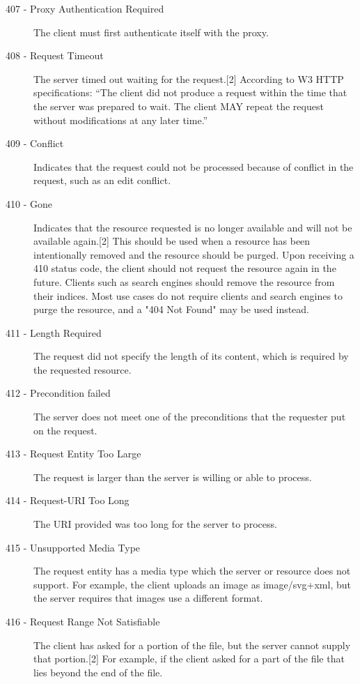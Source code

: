 \begin{description}
	\item [407 - Proxy Authentication Required] The client must first authenticate itself with the proxy.

	\item [408 - Request Timeout] The server timed out waiting for the request.[2] According to W3 HTTP specifications: \enquote{The client did not produce a request within the time that the server was prepared to wait. The client MAY repeat the request without modifications at any later time.}

	\item [409 - Conflict] Indicates that the request could not be processed because of conflict in the request, such as an edit conflict.

	\item [410 - Gone] Indicates that the resource requested is no longer available and will not be available again.[2] This should be used when a resource has been intentionally removed and the resource should be purged. Upon receiving a 410 status code, the client should not request the resource again in the future. Clients such as search engines should remove the resource from their indices. Most use cases do not require clients and search engines to purge the resource, and a "404 Not Found" may be used instead.

	\item [411 - Length Required] The request did not specify the length of its content, which is required by the requested resource.

	\item [412 - Precondition failed] The server does not meet one of the preconditions that the requester put on the request.

	\item [413 - Request Entity Too Large] The request is larger than the server is willing or able to process.

	\item [414 - Request-URI Too Long] The URI provided was too long for the server to process.

	\item [415 - Unsupported Media Type] The request entity has a media type which the server or resource does not support. For example, the client uploads an image as image/svg+xml, but the server requires that images use a different format.

	\item [416 - Request Range Not Satisfiable] The client has asked for a portion of the file, but the server cannot supply that portion.[2] For example, if the client asked for a part of the file that lies beyond the end of the file.


\end{description}
